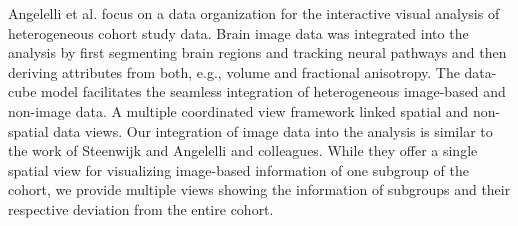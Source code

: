 \documentclass[journal]{style/vgtc} 			          %
\newcommand{\rem}[1]{\textcolor{red}{\sout{#1}}}
\begin{document}
Angelelli et al. \cite{Angelelli2014} focus on a data organization for the interactive visual analysis of heterogeneous cohort study data.
%
%
Brain image data was integrated into the analysis by first segmenting brain regions and tracking neural pathways and then deriving attributes from both, e.g., volume and fractional anisotropy.
%
The data-cube model facilitates the seamless integration of heterogeneous image-based and non-image data.
%
A multiple coordinated view framework linked spatial and non-spatial data views.
%
%
Our integration of image data into the analysis is similar to the work of Steenwijk \cite{Steenwijk2010} and Angelelli \cite{Angelelli2014} and colleagues.
%
While they offer a single spatial view for visualizing image-based information of one subgroup of the cohort, we provide multiple views showing the information of subgroups and their respective deviation from the entire cohort.
%
\end{document}
